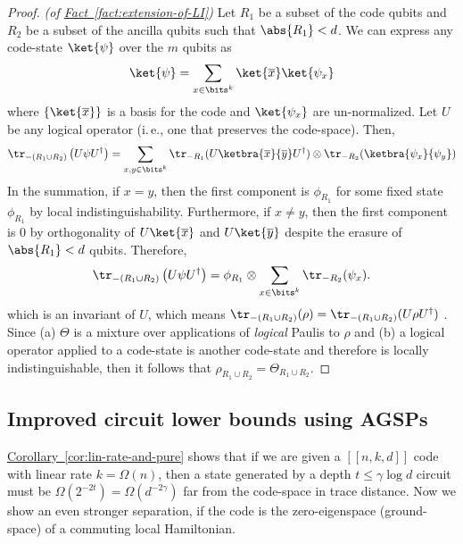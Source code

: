 \documentclass[11pt]{article}
\newcommand{\expref}[2]{\texorpdfstring{\hyperref[#2]{#1~\ref{#2}}}{#1~\ref{#2}}}
\newcommand{\ie}{i.\,e.}
\begin{document}
\begin{proof}
\textit{(of \expref{Fact}{fact:extension-of-LI})}
Let $R_1$ be a subset of the code qubits and $R_2$ be a subset of the ancilla qubits such that $\abs{R_1} < d$. We can express any code-state $\ket{\psi}$ over the $m$ qubits as
\begin{align}
    \ket{\psi} = \sum_{x \in \bits^k} \ket{\overline{x}} \ket{\psi_x}
\end{align}
where $\{\ket{\overline{x}}\}$ is a basis for the code and $\ket{\psi_x}$ are un-normalized. Let $U$ be any logical operator (\ie, one that preserves the code-space). Then,
\begin{align}
\tr_{-(R_1 \cup R_2)}\left(U \psi U^\dagger\right) = \sum_{x,y \in \bits^k} \tr_{-R_1}(U \ketbra{\overline{x}}{\overline{y}} U^\dagger) \otimes \tr_{-R_2} (\ketbra{\psi_x}{\psi_y})
\end{align}
In the summation, if $x = y$, then the first component is $\phi_{R_1}$ for some fixed state $\phi_{R_1}$ by local indistinguishability. Furthermore, if $x \neq y$, then the first component is $0$ by orthogonality of $U\ket{\overline{x}}$ and $U\ket{\overline{y}}$ despite the erasure of $\abs{R_1} < d$ qubits. Therefore,
\begin{align}
    \tr_{-(R_1 \cup R_2)} \left(U \psi U^\dagger \right) = \phi_{R_1} \otimes \sum_{x \in \bits^k}  \tr_{-R_2}(\psi_x).
\end{align}
which is an invariant of $U$, which means $\tr_{-(R_1 \cup R_2)}(\rho) = \tr_{-(R_1 \cup R_2)}(U \rho U^\dagger)$ . Since (a) $\Theta$ is a mixture over applications of \emph{logical} Paulis to $\rho$ and (b) a logical operator applied to a code-state is another code-state and therefore is locally indistinguishable, then it follows that $\rho_{R_1 \cup R_2} = \Theta_{R_1 \cup R_2}$.
\end{proof}


\subsection{Improved circuit lower bounds using AGSPs}

\expref{Corollary}{cor:lin-rate-and-pure} shows that if we are given a $[[n,k,d]]$ code with linear rate $k=\Omega(n)$, then a state generated by a depth $t \leq \gamma\log d$ circuit must be $\Omega\left(2^{-2t}\right)=\Omega\left(d^{-2\gamma}\right)$ far from the code-space in trace distance. Now we show an even stronger separation, if the code is the zero-eigenspace (ground-space) of a commuting local Hamiltonian. 
\end{document}
